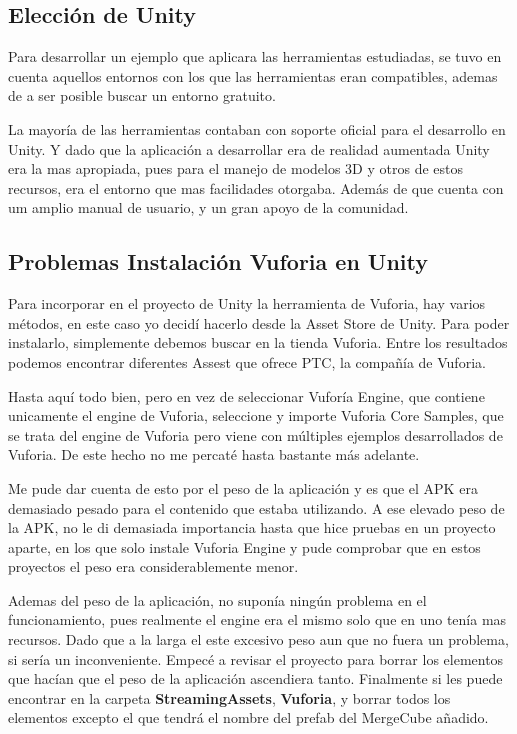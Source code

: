 \subsection{Elección de Unity}
Para desarrollar un ejemplo que aplicara las herramientas estudiadas, se tuvo en cuenta aquellos entornos con los que las herramientas eran compatibles, ademas de a ser posible buscar un entorno gratuito. 

La mayoría de las herramientas contaban con soporte oficial para el desarrollo en Unity. Y dado que la aplicación a desarrollar era de realidad aumentada Unity era la mas apropiada, pues para el manejo de modelos 3D y otros de estos recursos, era el entorno que mas facilidades otorgaba. Además de que cuenta con um amplio manual de usuario, y un gran apoyo de la comunidad.

\subsection{Problemas Instalación Vuforia en Unity}
Para incorporar en el proyecto de Unity la herramienta de Vuforia, hay varios métodos, en este caso yo decidí hacerlo desde la Asset Store de Unity. Para poder instalarlo, simplemente debemos buscar en la tienda Vuforia. Entre los resultados podemos encontrar diferentes Assest que ofrece PTC, la compañía de Vuforia. 

Hasta aquí todo bien, pero en vez de seleccionar Vuforía Engine, que contiene unicamente el engine de Vuforia, seleccione y importe Vuforia Core Samples, que se trata del engine de Vuforia pero viene con múltiples ejemplos desarrollados de Vuforia. De este hecho no me percaté hasta bastante más adelante. 

Me pude dar cuenta de esto por el peso de la aplicación y es que el APK era demasiado pesado para el contenido que estaba utilizando. A ese elevado peso de la APK, no le di demasiada importancia hasta que hice pruebas en un proyecto aparte, en los que solo instale Vuforia Engine y pude comprobar que en estos proyectos el peso era considerablemente menor.

Ademas del peso de la aplicación, no suponía ningún problema en el funcionamiento, pues realmente el engine era el mismo solo que en uno tenía mas recursos. Dado que a la larga el este excesivo peso aun que no fuera un problema, si sería un inconveniente. Empecé a revisar el proyecto para borrar los elementos que hacían que el peso de la aplicación ascendiera tanto. Finalmente si les puede encontrar en la carpeta \textbf{StreamingAssets}, \textbf{Vuforia}, y borrar todos los elementos excepto el que tendrá el nombre del prefab del MergeCube añadido.

